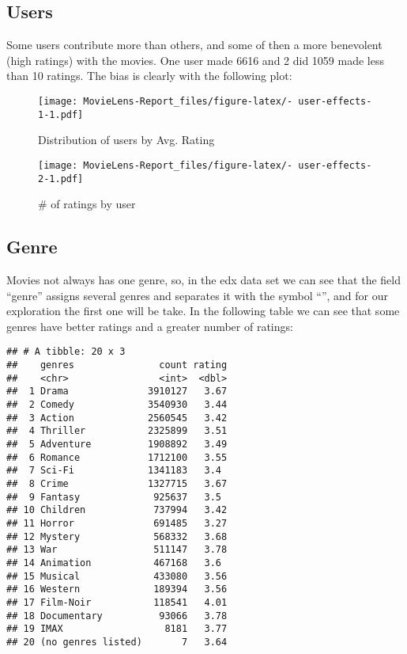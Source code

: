 \documentclass[
]{article}
\begin{document}
\hypertarget{users}{%
\subsection{Users}\label{users}}

Some users contribute more than others, and some of then a more
benevolent (high ratings) with the movies. One user made 6616 and 2 did
1059 made less than 10 ratings. The bias is clearly with the following
plot:

\begin{figure}
\centering
\texttt{[image: MovieLens-Report\_files/figure-latex/- user-effects-1-1.pdf]}
\caption{Distribution of users by Avg. Rating}
\end{figure}

\begin{figure}
\centering
\texttt{[image: MovieLens-Report\_files/figure-latex/- user-effects-2-1.pdf]}
\caption{\# of ratings by user}
\end{figure}

\hypertarget{genre}{%
\subsection{Genre}\label{genre}}

Movies not always has one genre, so, in the edx data set we can see that
the field ``genre'' assigns several genres and separates it with the
symbol ``\textbar{}'', and for our exploration the first one will be
take. In the following table we can see that some genres have better
ratings and a greater number of ratings:

\begin{verbatim}
## # A tibble: 20 x 3
##    genres               count rating
##    <chr>                <int>  <dbl>
##  1 Drama              3910127   3.67
##  2 Comedy             3540930   3.44
##  3 Action             2560545   3.42
##  4 Thriller           2325899   3.51
##  5 Adventure          1908892   3.49
##  6 Romance            1712100   3.55
##  7 Sci-Fi             1341183   3.4 
##  8 Crime              1327715   3.67
##  9 Fantasy             925637   3.5 
## 10 Children            737994   3.42
## 11 Horror              691485   3.27
## 12 Mystery             568332   3.68
## 13 War                 511147   3.78
## 14 Animation           467168   3.6 
## 15 Musical             433080   3.56
## 16 Western             189394   3.56
## 17 Film-Noir           118541   4.01
## 18 Documentary          93066   3.78
## 19 IMAX                  8181   3.77
## 20 (no genres listed)       7   3.64
\end{verbatim}
\end{document}
